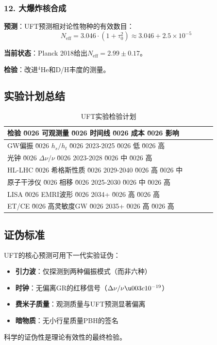 \subsubsection{12. 大爆炸核合成}

\begin{test}[原初元素丰度]
\textbf{预测}：UFT预测相对论性物种的有效数目：
\begin{equation}
    N_{\text{eff}} = 3.046 \cdot (1 + \tau_0^2) \approx 3.046 + 2.5 \times 10^{-5}
\end{equation}

\textbf{当前状态}：Planck 2018给出$N_{\text{eff}} = 2.99 \pm 0.17$。

\textbf{检验}：改进$^4$He和D/H丰度的测量。
\end{test}

\subsection{实验计划总结}

\begin{table}[htbp]
\centering
\caption{UFT实验检验计划}
\begin{tabular}{@{}llccc@{}}
\toprule
\textbf{检验} \u0026 \textbf{可观测量} \u0026 \textbf{时间线} \u0026 \textbf{成本} \u0026 \textbf{影响} \\
\midrule
GW偏振 \u0026 $h_s/h_t$ \u0026 2023-2025 \u0026 低 \u0026 高 \\
光钟 \u0026 $\Delta\nu/\nu$ \u0026 2023-2028 \u0026 中 \u0026 高 \\
HL-LHC \u0026 希格斯性质 \u0026 2029-2040 \u0026 高 \u0026 中 \\
原子干涉仪 \u0026 相移 \u0026 2025-2030 \u0026 中 \u0026 高 \\
LISA \u0026 EMRI波形 \u0026 2034+ \u0026 高 \u0026 高 \\
ET/CE \u0026 高灵敏度GW \u0026 2035+ \u0026 高 \u0026 高 \\
\bottomrule
\end{tabular}
\end{table}

\subsection{证伪标准}

UFT的核心预测可用下一代实验证伪：
\begin{itemize}
    \item \textbf{引力波}：仅探测到两种偏振模式（而非六种）
    \item \textbf{时钟}：无偏离GR的红移信号（$\Delta\nu/\nu \u003c 10^{-19}$）
    \item \textbf{费米子质量}：观测质量与UFT预测显著偏离
    \item \textbf{暗物质}：无小行星质量PBH的签名
\end{itemize}

科学的证伪性是理论有效性的最终检验。
